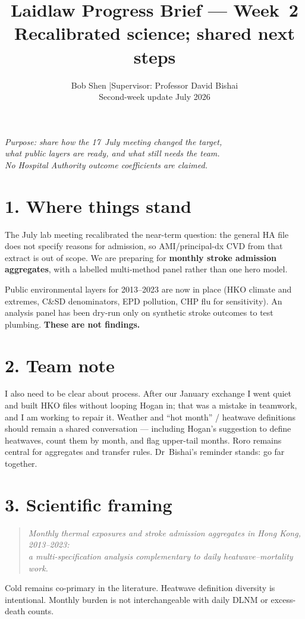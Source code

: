 \documentclass[11pt]{article}
\title{\vspace{-1.2em}\textbf{Laidlaw Progress Brief --- Week~2}\\[0.35em]
\large Recalibrated science; shared next steps}
\author{Bob Shen \quad|\quad Supervisor: Professor David Bishai\\
\small Second-week update \quad July 2026}
\date{}
\begin{document}
\maketitle
\vspace{-1.5em}

\begin{center}
\textit{Purpose: share how the 17~July meeting changed the target,\\
what public layers are ready, and what still needs the team.\\
No Hospital Authority outcome coefficients are claimed.}
\end{center}

\section*{1. Where things stand}
The July lab meeting recalibrated the near-term question: the general HA file does not specify reasons for admission, so AMI/principal-dx CVD from that extract is out of scope. We are preparing for \textbf{monthly stroke admission aggregates}, with a labelled multi-method panel rather than one hero model.

Public environmental layers for 2013--2023 are now in place (HKO climate and extremes, C\&SD denominators, EPD pollution, CHP flu for sensitivity). An analysis panel has been dry-run only on synthetic stroke outcomes to test plumbing. \textbf{These are not findings.}

\section*{2. Team note}
I also need to be clear about process. After our January exchange I went quiet and built HKO files without looping Hogan in; that was a mistake in teamwork, and I am working to repair it. Weather and ``hot month'' / heatwave definitions should remain a shared conversation --- including Hogan's suggestion to define heatwaves, count them by month, and flag upper-tail months. Roro remains central for aggregates and transfer rules. Dr~Bishai's reminder stands: go far together.

\section*{3. Scientific framing}
\begin{quote}
\textit{Monthly thermal exposures and stroke admission aggregates in Hong Kong, 2013--2023:\\
a multi-specification analysis complementary to daily heatwave--mortality work.}
\end{quote}
Cold remains co-primary in the literature. Heatwave definition diversity is intentional. Monthly burden is not interchangeable with daily DLNM or excess-death counts.
\end{document}
